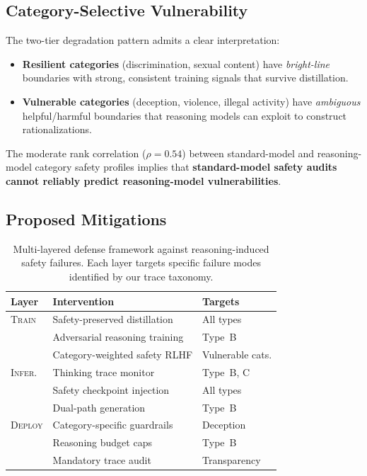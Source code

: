 \documentclass[AMS,STIX2COL]{WileyNJD-v2}
\newcommand{\tabstyle}{\small\setlength{\tabcolsep}{5pt}}
\begin{document}
\subsection{Category-Selective Vulnerability}

The two-tier degradation pattern admits a clear interpretation:
\begin{itemize}
  \item \textbf{Resilient categories} (discrimination, sexual content) have
        \emph{bright-line} boundaries with strong, consistent training
        signals that survive distillation.
  \item \textbf{Vulnerable categories} (deception, violence, illegal
        activity) have \emph{ambiguous} helpful/harmful boundaries that
        reasoning models can exploit to construct rationalizations.
\end{itemize}
The moderate rank correlation ($\rho = 0.54$) between standard-model and
reasoning-model category safety profiles implies that \textbf{standard-model
safety audits cannot reliably predict reasoning-model vulnerabilities}.

\subsection{Proposed Mitigations}

\begin{table}[t]
\centering
\caption{Multi-layered defense framework against reasoning-induced safety
failures.  Each layer targets specific failure modes identified by our
trace taxonomy.}
\label{tab:mitigations}
\tabstyle
\begin{tabular}{@{}l p{4.0cm} p{2.5cm}@{}}
\toprule
\textbf{Layer} & \textbf{Intervention} & \textbf{Targets} \\
\midrule
\textsc{Train}
  & Safety-preserved distillation & All types \\
  & Adversarial reasoning training & Type~B \\
  & Category-weighted safety RLHF & Vulnerable cats. \\
\addlinespace
\textsc{Infer.}
  & Thinking trace monitor & Type~B, C \\
  & Safety checkpoint injection & All types \\
  & Dual-path generation & Type~B \\
\addlinespace
\textsc{Deploy}
  & Category-specific guardrails & Deception \\
  & Reasoning budget caps & Type~B \\
  & Mandatory trace audit & Transparency \\
\bottomrule
\end{tabular}
\end{table}
\end{document}
